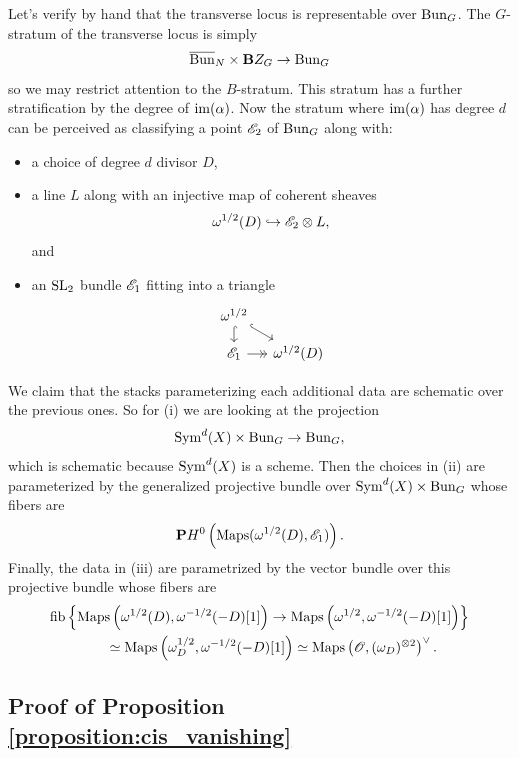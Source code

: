 \subsubsection{} Let's verify by hand that the transverse locus is representable over $\mathrm{Bun}_G$. The $G$-stratum of the transverse locus is simply
    \[\overline{\mathrm{Bun}}_N \times \mathbf{B} Z_G \to \mathrm{Bun}_G\]
so we may restrict attention to the $B$-stratum. This stratum has a further stratification by the degree of $\mathrm{im}(\alpha)$. Now the stratum where $\mathrm{im}(\alpha)$ has degree $d$ can be perceived as classifying a point $\mathscr{E}_2$ of $\mathrm{Bun}_G$ along with:
\begin{itemize}
    \item[(i)] a choice of degree $d$ divisor $D$,
    \item[(ii)] a line $L$ along with an injective map of coherent sheaves
        \[\omega^{1/2}(D) \hookrightarrow \mathscr{E}_2 \otimes L,\]
    and
    \item[(iii)] an $\mathrm{SL}_2$ bundle $\mathscr{E}_1$ fitting into a triangle 
        \[
        \begin{tikzcd}[
          column sep={1em},
          row sep={1em}
        ]
            \omega^{1/2} \arrow[d, hook] \arrow[dr, hook] & \\
            \EE_1 \arrow[r, ->>] & \omega^{1/2}(D)
        \end{tikzcd}
        \]
\end{itemize}
We claim that the stacks parameterizing each additional data are schematic over the previous ones. So for (i) we are looking at the projection
    \[\mathrm{Sym}^d(X) \times \mathrm{Bun}_G \to \mathrm{Bun}_G,\]
which is schematic because $\mathrm{Sym}^d(X)$ is a scheme. Then the choices in (ii) are parameterized by the generalized projective bundle over $\mathrm{Sym}^d(X) \times \mathrm{Bun}_G$ whose fibers are 
    \[\mathbf{P} H^0\left( \mathrm{Maps}(\omega^{1/2}(D), \mathscr{E}_1) \right).\]
Finally, the data in (iii) are parametrized by the vector bundle over this projective bundle whose fibers are
\begin{align*}
    & \mathrm{fib} \left\{ \mathrm{Maps}\left(\omega^{1/2}(D), \omega^{-1/2}(-D)[1] \right) \to \mathrm{Maps}\left( \omega^{1/2}, \omega^{-1/2}(-D)[1] \right) \right\}   \\
    & \qquad \qquad \simeq \mathrm{Maps}\left(\omega^{1/2}_D, \omega^{-1/2}(-D) [1] \right)
    \simeq \mathrm{Maps}\left( \mathscr{O}, (\omega_D)^{\otimes 2} \right)^\vee.
\end{align*}

\subsection{Proof of Proposition \ref{proposition:cis_vanishing}}

